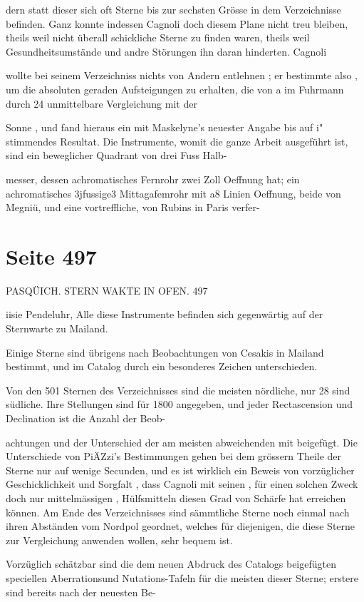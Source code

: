 \documentclass[10pt,a4paper]{article}
\begin{document}
dern statt dieser sich oft Sterne bis zur sechsten Grösse in dem Verzeichnisse befinden. Ganz konnte indessen Cagnoli doch diesem Plane nicht treu bleiben, theils weil nicht überall schickliche Sterne zu finden waren, theils weil Gesundheitsumstände und andre Störungen ihn daran hinderten. Cagnoli

wollte bei seinem Verzeichniss nichts von Andern entlehnen ; er bestimmte also , um die absoluten geraden Aufsteigungen zu erhalten, die von a im Fuhrmann durch 24 unmittelbare Vergleichung mit der

Sonne , und fand hieraus ein mit Maskelyne's neuester Angabe bis auf i" stimmendes Resultat. Die Instrumente, womit die ganze Arbeit ausgeführt ist, sind ein beweglicher Quadrant von drei Fuss Halb-

messer, dessen achromatisches Fernrohr zwei Zoll Oeffnung hat; ein achromatisches 3jfussige3 Mittagafemrohr mit a8 Linien Oeffnung, beide von Megniü, und eine vortreffliche, von Rubins in Paris verfer-


\newpage
\section*{Seite 497}
PASQÜICH. STERN WAKTE IN OFEN. 497

iisie Pendeluhr, Alle diese Instrumente befinden sich gegenwärtig auf der Sternwarte zu Mailand.

Einige Sterne sind übrigens nach Beobachtungen von Cesakis in Mailand bestimmt, und im Catalog durch ein besonderes Zeichen unterschieden.

Von den 501 Sternen des Verzeichnisses sind die meisten nördliche, nur 28 sind südliche. Ihre Stellungen sind für 1800 angegeben, und jeder Rectascension und Declination ist die Anzahl der Beob-

achtungen und der Unterschied der am meisten abweichenden mit beigefügt. Die Unterschiede von PiÄZzi's Bestimmungen gehen bei dem grössern Theile der Sterne nur auf wenige Secunden, und es ist wirklich ein Beweis von vorzüglicher Geschicklichkeit und Sorgfalt , dass Cagnoli mit seinen , für einen solchen Zweck doch nur mittelmässigen , Hülfsmitteln diesen Grad von Schärfe hat erreichen können. Am Ende des Verzeichnisses sind sämmtliche Sterne noch einmal nach ihren Abständen vom Nordpol geordnet, welches für diejenigen, die diese Sterne zur Vergleichung anwenden wollen, sehr bequem ist.

Vorzüglich schätzbar sind die dem neuen Abdruck des Catalogs beigefügten speciellen Aberrationsund Nutations-Tafeln für die meisten dieser Sterne; erstere sind bereits nach der neuesten Be-
\end{document}
